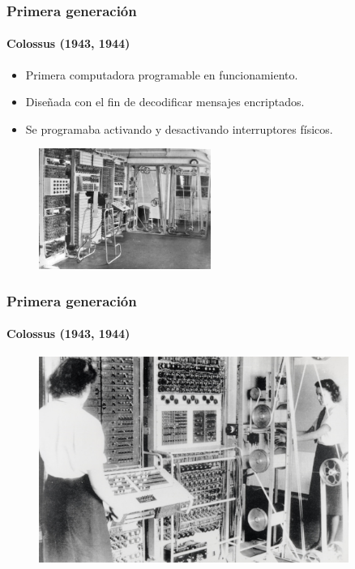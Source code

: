 \documentclass[11pt,a4paper,spanish]{beamer}
\begin{document}
\begin{frame}

\frametitle{Primera generación}
\framesubtitle{Colossus (1943, 1944)}


    \begin{itemize}
        \item Primera computadora programable en funcionamiento.
        \item Diseñada con el fin de decodificar mensajes encriptados.
        \item Se programaba activando y desactivando interruptores físicos.
    \end{itemize}


    \begin{figure}
        \includegraphics[width=0.5\textwidth]{img/colossus.jpg}
        \captionsetup{textfont=tiny,labelformat=empty}
        \caption{}
    \end{figure}


\end{frame}

\begin{frame}

\frametitle{Primera generación}
\framesubtitle{Colossus (1943, 1944)}

\begin{figure}
    \includegraphics[width=0.9\textwidth]{img/colossus2.jpg}
    \captionsetup{textfont=tiny,labelformat=empty}
    \caption{}
\end{figure}

\end{frame}
\end{document}
